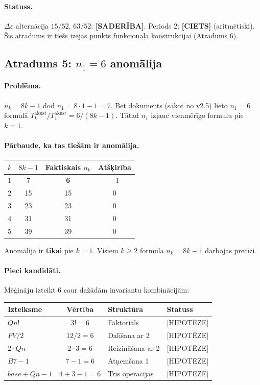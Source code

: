 \documentclass[12pt,a4paper]{article}
\begin{document}
\paragraph{Statuss.}
$\Delta\varepsilon$ alternācija $15/52$, $63/52$: \textbf{[SADERĪBA]}. Periods 2: \textbf{[CIETS]} (aritmētiski). Šis atradums ir tiešs izejas punkts funkcionāļa konstrukcijai (Atradums 6).

\subsection*{Atradums 5: $n_1 = 6$ anomālija}

\paragraph{Problēma.}
$n_k = 8k-1$ dod $n_1 = 8 \cdot 1 - 1 = 7$. Bet dokuments (sākot no v2.5) lieto $n_1 = 6$ formulā $T_k^{\text{akust}}/T_1^{\text{akust}} = 6/(8k-1)$. Tātad $n_1$ izjauc vienmērīgo formulu pie $k=1$.

\paragraph{Pārbaude, ka tas tiešām ir anomālija.}
\begin{table}[h]
\centering
\begin{tabular}{|c|c|c|c|}
\hline
$k$ & $8k-1$ & Faktiskais $n_k$ & Atšķirība \\
\hline
1 & 7 & \textbf{6} & $-1$ \\
2 & 15 & 15 & 0 \\
3 & 23 & 23 & 0 \\
4 & 31 & 31 & 0 \\
5 & 39 & 39 & 0 \\
\hline
\end{tabular}
\end{table}

Anomālija ir \textbf{tikai} pie $k=1$. Visiem $k \geq 2$ formula $n_k = 8k-1$ darbojas precīzi.

\paragraph{Pieci kandidāti.}
Mēģināju izteikt $6$ caur dažādām invariantu kombinācijām:

\begin{table}[h]
\centering
\begin{tabular}{|l|c|l|l|}
\hline
\textbf{Izteiksme} & \textbf{Vērtība} & \textbf{Struktūra} & \textbf{Statuss} \\
\hline
$Qn!$ & $3! = 6$ & Faktoriāls & [HIPOTĒZE] \\
$FV/2$ & $12/2 = 6$ & Dalīšana ar 2 & [HIPOTĒZE] \\
$2 \cdot Qn$ & $2 \cdot 3 = 6$ & Reizināšana ar 2 & [HIPOTĒZE] \\
$B7 - 1$ & $7 - 1 = 6$ & Atņemšana 1 & [HIPOTĒZE] \\
$base + Qn - 1$ & $4 + 3 - 1 = 6$ & Trīs operācijas & [HIPOTĒZE] \\
\hline
\end{tabular}
\end{table}
\end{document}
